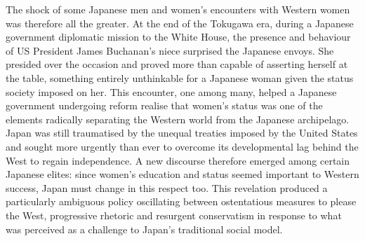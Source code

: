 \documentclass[11pt,a4paper]{article}
\begin{document}
The shock of some Japanese men and women's encounters with Western women was therefore all the greater. At the end of the Tokugawa era, during a Japanese government diplomatic mission to the White House, the presence and behaviour of US President James Buchanan's niece surprised the Japanese envoys. She presided over the occasion and proved more than capable of asserting herself at the table, something entirely unthinkable for a Japanese woman given the status society imposed on her. This encounter, one among many, helped a Japanese government undergoing reform realise that women's status was one of the elements radically separating the Western world from the Japanese archipelago. Japan was still traumatised by the unequal treaties imposed by the United States and sought more urgently than ever to overcome its developmental lag behind the West to regain independence. A new discourse therefore emerged among certain Japanese elites: since women's education and status seemed important to Western success, Japan must change in this respect too. This revelation produced a particularly ambiguous policy oscillating between ostentatious measures to please the West, progressive rhetoric and resurgent conservatism in response to what was perceived as a challenge to Japan's traditional social model.
\end{document}

